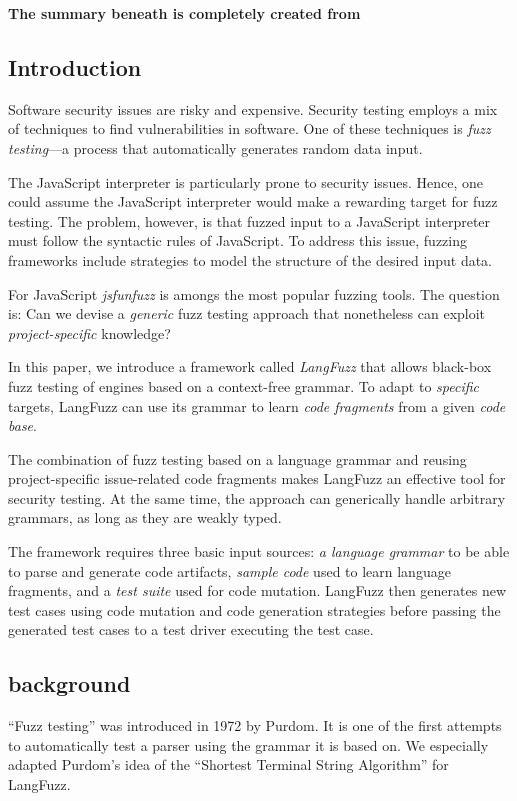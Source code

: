 \textbf{The summary beneath is completely created from \cite{holler2012fuzzing}}
\\
\subsection{Introduction}
Software security issues are risky and expensive. 
Security testing employs a mix of techniques to find vulnerabilities in software. 
One of these techniques is \textit{fuzz testing}---a process that automatically generates random data input. 

The JavaScript interpreter is particularly prone to security issues. 
Hence, one could assume the JavaScript interpreter would make a rewarding target for fuzz testing. The problem, however, is that fuzzed input to a JavaScript interpreter must follow the syntactic rules of JavaScript.
To address this issue, fuzzing frameworks include strategies to model the structure of the desired input data.

For JavaScript \textit{jsfunfuzz} is amongs the most popular fuzzing tools.
The question is: Can we devise a \textit{generic} fuzz testing approach that nonetheless can exploit \textit{project-specific} knowledge?

In this paper, we introduce a framework called \textit{LangFuzz} that allows black-box fuzz testing of engines based on a context-free grammar.
To adapt to \textit{specific} targets, LangFuzz can use its grammar to learn \textit{code fragments} from a given \textit{code base}.

The combination of fuzz testing based on a language grammar and reusing project-specific issue-related code fragments makes LangFuzz an effective tool for security testing.
At the same time, the approach can generically handle arbitrary grammars, as long as they are weakly typed.

The framework requires three basic input sources: \textit{a language grammar} to be able to parse and generate code artifacts, \textit{sample code} used to learn language fragments, and a \textit{test suite} used for code mutation.
LangFuzz then generates new test cases using code mutation and code generation strategies before passing the generated test cases to a test driver executing the test case.

\subsection{background}
``Fuzz testing'' was introduced in 1972 by Purdom. 
It is one of the first attempts to automatically test a parser using the grammar it is based on.
We especially adapted Purdom's idea of the ``Shortest Terminal String Algorithm'' for LangFuzz.

